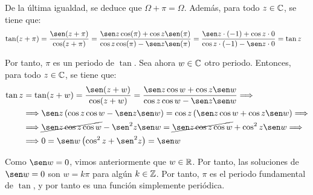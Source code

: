 \begin{ejercicio}
    De la última igualdad, se deduce que $\Omega+\pi=\Omega$. Además, para todo $z\in \mathbb{C}$, se tiene que:
    \begin{align*}
        \tan(z+\pi) &= \frac{\sen(z+\pi)}{\cos(z+\pi)} = \frac{\sen z\cos(\pi)+\cos z\sen(\pi)}{\cos z\cos(\pi)-\sen z\sen(\pi)} = \frac{\sen z\cdot (-1)+\cos z\cdot 0}{\cos z\cdot (-1)-\sen z\cdot 0} = \tan z
    \end{align*}

    Por tanto, $\pi$ es un periodo de $\tan$. Sea ahora $w\in \mathbb{C}$ otro periodo. Entonces, para todo $z\in \mathbb{C}$, se tiene que:
    \begin{align*}
        \tan z &= \tan(z+w) = \frac{\sen(z+w)}{\cos(z+w)} = \frac{\sen z\cos w + \cos z\sen w}{\cos z\cos w - \sen z\sen w}
        \Longrightarrow\\&\Longrightarrow
        \sen z \left(\cos z \cos w - \sen z\sen w\right) = \cos z \left(\sen z \cos w + \cos z\sen w\right)
        \Longrightarrow\\&\Longrightarrow
        \cancel{\sen z \cos z \cos w} - \sen^2 z \sen w = \cancel{\sen z \cos z \cos w} + \cos^2 z \sen w
        \Longrightarrow\\&\Longrightarrow
        0 = \sen w\left(\cos^2 z + \sen^2 z\right) = \sen w
    \end{align*}
    
    Como $\sen w=0$, vimos anteriormente que $w\in \mathbb{R}$. Por tanto, las soluciones de $\sen w=0$ son $w=k\pi$ para algún $k\in \mathbb{Z}$. Por tanto, $\pi$ es el periodo fundamental de $\tan$, y por tanto es una función simplemente periódica.
\end{ejercicio}

